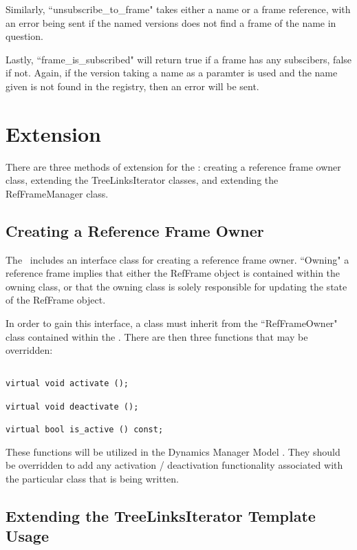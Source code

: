 Similarly, ``unsubscribe\_to\_frame" takes either a name or a frame
reference, with an error being sent if the named versions does not
find a frame of the name in question.

Lastly, ``frame\_is\_subscribed" will return true if a frame
has any subscibers, false if not. Again, if the version taking
a name as a paramter is used and the name given is not found
in the registry, then an error will be sent.

\section{Extension}

There are three methods of extension for the : creating
a reference frame owner class, extending the TreeLinksIterator classes, and
extending the RefFrameManager class.

\subsection{Creating a Reference Frame Owner}

The \ includes an interface class for creating a reference
frame owner. ``Owning" a reference frame implies that either the RefFrame
object is contained within the owning class, or that the owning class is solely
responsible for updating the state of the RefFrame object.

In order to gain this interface, a class must inherit from the ``RefFrameOwner"
class contained within the . There are then three functions
that may be overridden:

\begin{verbatim}

virtual void activate ();

virtual void deactivate ();

virtual bool is_active () const;
\end{verbatim}

These functions will be utilized in the Dynamics Manager Model
\cite{dynenv:DYNMANAGER}. They should be overridden to add any
activation / deactivation functionality associated with the particular class
that is being written.

\subsection{Extending the TreeLinksIterator Template Usage}

